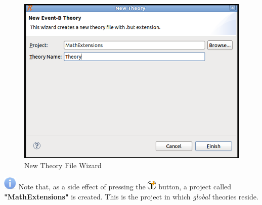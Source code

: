 \begin{center}
\begin{figure}
\label{newTFW}
\includegraphics{images/NewTheoryWizard.png}
\caption{New Theory File Wizard}
\end{figure}
\end{center}

\includegraphics{images/info.png} Note that, as a side effect of pressing the \includegraphics{images/newThy.png} button, a project called \textbf{"MathExtensions"} is created. This is the project in which \textit{global} theories reside.
\par 

